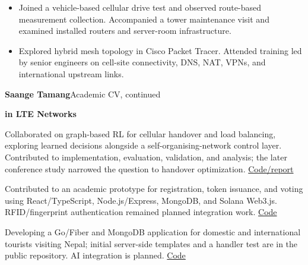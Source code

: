 \documentclass[11pt,letterpaper]{article}
\begin{document}
\begin{itemize}
\item Joined a vehicle-based cellular drive test and observed route-based measurement collection. Accompanied a tower maintenance visit and examined installed routers and server-room infrastructure.
\item Explored hybrid mesh topology in Cisco Packet Tracer. Attended training led by senior engineers on cell-site connectivity, DNS, NAT, VPNs, and international upstream links.
\end{itemize}

\newpage
{\fontsize{15}{18}\selectfont\bfseries Saange Tamang}\hfill{\color{muted}\small Academic CV, continued}\par

\textbf{in LTE Networks}\par
{}
Collaborated on graph-based RL for cellular handover and load balancing, exploring learned decisions alongside a self-organising-network control layer. Contributed to implementation, evaluation, validation, and analysis; the later conference study narrowed the question to handover optimization.\enspace
\href{https://github.com/Sange-creator/GNN-DQN-Handover-LoadBalancing}{Code/report}

\vspace{7pt}
Contributed to an academic prototype for registration, token issuance, and voting using React/TypeScript, Node.js/Express, MongoDB, and Solana Web3.js. RFID/fingerprint authentication remained planned integration work.\enspace
\href{https://github.com/Sange-creator/Project-Solvote}{Code}

\vspace{7pt}
Developing a Go/Fiber and MongoDB application for domestic and international tourists visiting Nepal; initial server-side templates and a handler test are in the public repository. AI integration is planned.\enspace
\href{https://github.com/Sange-creator/GO_Tourism_Project}{Code}
\end{document}
